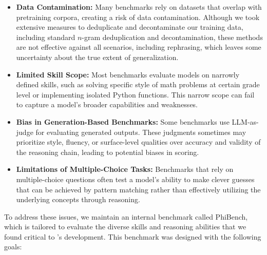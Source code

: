 \begin{itemize}
    \item \textbf{Data Contamination:} Many benchmarks rely on datasets that overlap with pretraining corpora, creating a risk of data contamination. Although we took extensive measures to deduplicate and decontaminate our training data, including standard $n$-gram deduplication and decontamination, these methods are not effective against all scenarios, including rephrasing, which leaves some uncertainty about the true extent of generalization.
    \item \textbf{Limited Skill Scope:} Most benchmarks evaluate models on narrowly defined skills, such as solving specific style of math problems at certain grade level or implementing isolated Python functions. This narrow scope can fail to capture a model’s broader capabilities and weaknesses.
    \item \textbf{Bias in Generation-Based Benchmarks:} Some benchmarks use LLM-as-judge for evaluating generated outputs. These judgments sometimes may prioritize style, fluency, or surface-level qualities over accuracy and validity of the reasoning chain, leading to potential biases in scoring.
    \item \textbf{Limitations of Multiple-Choice Tasks:} Benchmarks that rely on multiple-choice questions often test a model’s ability to make clever guesses that can be achieved by pattern matching rather than effectively utilizing the underlying concepts through reasoning.
\end{itemize}

To address these issues, we maintain an internal benchmark called {PhiBench}, which is tailored to evaluate the diverse skills and reasoning abilities that we found critical to \modelwithoutspace’s development. This benchmark was designed with the following goals:

